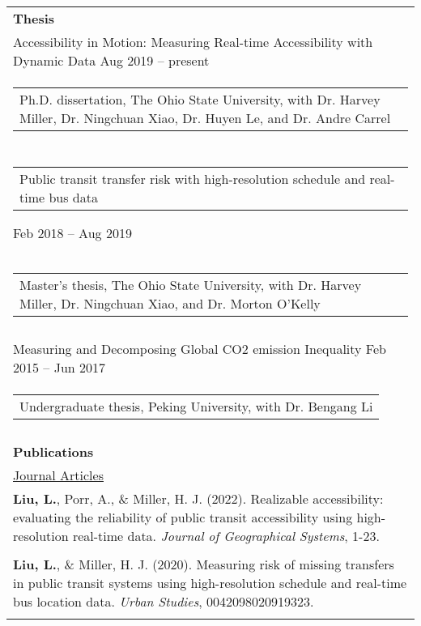 \documentclass[letterpaper, 11pt]{article}
\begin{document}
\begin{longtable}{p{6.5in}}

{\textbf{Thesis}}\\

Accessibility in Motion: Measuring Real-time Accessibility with Dynamic Data \hfill Aug 2019 -- present \\ 
\begin{tabular}{p{5in}}
Ph.D. dissertation, The Ohio State University, with Dr. Harvey Miller, Dr. Ningchuan Xiao, Dr. Huyen Le, and Dr. Andre Carrel
\end{tabular} \\ \\

\begin{tabular}{p{5in}}
Public transit transfer risk with high-resolution schedule and real-time bus data 
\end{tabular} \hfill Feb 2018 -- Aug 2019 \\
\begin{tabular}{p{5in}}
Master's thesis, The Ohio State University, with Dr. Harvey Miller, Dr. Ningchuan Xiao, and Dr. Morton O'Kelly
\end{tabular} \\ \\


Measuring and Decomposing Global CO2 emission Inequality \hfill Feb 2015 -- Jun 2017 \\ 
\begin{tabular}{p{5in}}
Undergraduate thesis, Peking University, with Dr. Bengang Li
\end{tabular} \\ \\

\nohyphens{\textbf{Publications}} \\
\underline{Journal Articles} \\
\textbf{Liu, L.}, Porr, A., \& Miller, H. J. (2022). Realizable accessibility: evaluating the reliability of public transit accessibility using high-resolution real-time data. \textit{Journal of Geographical Systems}, 1-23.\\\\

\textbf{Liu, L.}, \& Miller, H. J. (2020). Measuring risk of missing transfers in public transit systems using high-resolution schedule and real-time bus location data. \textit{Urban Studies}, 0042098020919323.\\\\


\end{longtable}
\end{document}
